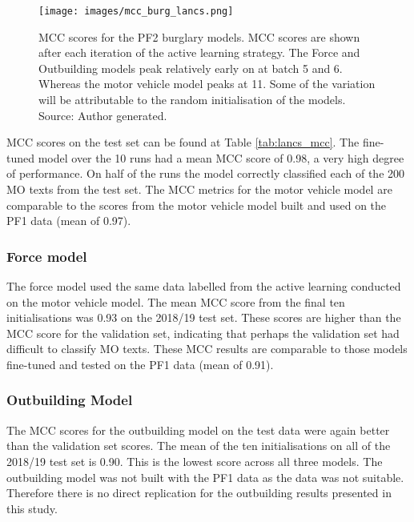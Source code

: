 \begin{figure}[!tbp]
  \centering
    \texttt{[image: images/mcc\_burg\_lancs.png]}
    \caption[MCC scores for the PF2 burglary models.]{{MCC scores for the PF2 burglary models.} MCC scores are shown after each iteration of the active learning strategy. The Force and Outbuilding models peak relatively early on at batch 5 and 6. Whereas the motor vehicle model peaks at 11. Some of the variation will be attributable to the random initialisation of the models. Source: Author generated.}
    \label{fig:mcc_burg_lancs}
\end{figure}


MCC scores on the test set can be found at Table \ref{tab:lancs_mcc}. The fine-tuned model over the 10 runs had a mean MCC score of 0.98, a very high degree of performance. On half of the runs the model correctly classified each of the 200 MO texts from the test set. The MCC metrics for the motor vehicle model are comparable to the scores from the motor vehicle model built and used on the PF1 data (mean of 0.97). 

\subsubsection{Force model} The force model used the same data labelled from the active learning conducted on the motor vehicle model. The mean MCC score from the final ten initialisations was 0.93 on the 2018/19 test set. These scores are higher than the MCC score for the validation set, indicating that perhaps the validation set had difficult to classify MO texts.  These MCC results are comparable to those models fine-tuned and tested on the PF1 data (mean of 0.91). 


\subsubsection{Outbuilding Model} The MCC scores for the outbuilding model on the test data were again better than the validation set scores. The mean of the ten initialisations on all of the 2018/19 test set is 0.90. This is the lowest score across all three models. The outbuilding model was not built with the PF1 data as the data was not suitable. Therefore there is no direct replication for the outbuilding results presented in this study.


